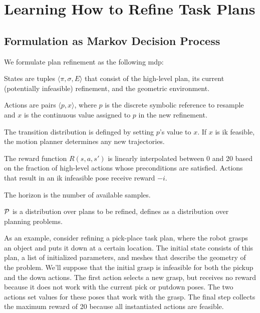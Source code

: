 \section{Learning How to Refine Task Plans}

\subsection{Formulation as Markov Decision Process}
We formulate plan refinement as the following {\sc mdp}:
\begin{tightlist}
\item States are tuples $\langle \pi, \sigma, E \rangle$ that consist of the
high-level plan, its current (potentially infeasible) refinement, and the
geometric environment.
\item Actions are pairs $\langle p, x \rangle$, where $p$ is the discrete symbolic
reference to resample and $x$ is the continuous value assigned to $p$ in the new refinement.
\item The transition distribution is definged by setting $p$'s value
  to $x$. If $x$ is {\sc ik} feasible, the motion planner determines
  any new trajectories.
\item The reward function $R(s, a, s')$ is linearly interpolated
  between 0 and 20 based on the fraction of high-level actions whose
  preconditions are satisfied. Actions that result in an {\sc ik}
  infeasible pose receive reward $-i$.
\item The horizon is the number of available samples.
\item $\mathcal{P}$ is a distribution over plans to be refined, defines as a
  distribution over planning problems.
\end{tightlist}

As an example, consider refining a pick-place task plan, where the
robot grasps an object and puts it down at a certain location. The
initial state consists of this plan, a list of initialized parameters,
and meshes that describe the geometry of the problem. We'll suppose
that the initial grasp is infeasible for both the pickup and the down
actions. The first action selects a new grasp, but receives no reward
because it does not work with the current pick or putdown poses. The
two actions set values for these poses that work with the grasp. The
final step collects the maximum reward of 20 because all instantiated
actions are feasible.

